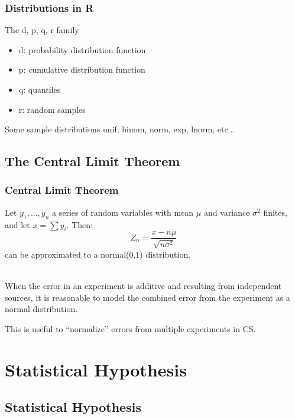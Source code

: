 \documentclass[10pt]{beamer}
\begin{document}
\begin{frame}
  \frametitle{Distributions in R}
  \begin{block}{The d, p, q, r family}
    \begin{itemize}
    \item d: probability distribution function
    \item p: cumulative distribution function
    \item q: quantiles
    \item r: random samples
    \end{itemize}
  \end{block}
  \begin{block}{Some sample distributions}
    unif, binom, norm, exp, lnorm, etc...
  \end{block}
\end{frame}


\subsection{The Central Limit Theorem}
\begin{frame}
  \frametitle{Central Limit Theorem}
  \begin{block}{}
    Let $y_1,...,y_n$ a series of random variables with mean $\mu$ and
    variance $\sigma^2$ finites, and let $x = \sum y_i$. Then:
    \begin{equation}
      Z_n = \frac{x - n\mu}{\sqrt{n\sigma^2}}
    \end{equation}
    can be approximated to a normal(0,1) distribution.
  \end{block}
  
  \bigskip

  \\ 
  When the error in an experiment is additive and resulting from
  independent sources, it is reasonable to model the combined error
  from the experiment as a normal distribution.
  \medskip

  This is useful to ``normalize'' errors from multiple experiments in
  CS.
\end{frame}


\section{Statistical Hypothesis}
\subsection{Statistical Hypothesis}
\end{document}
